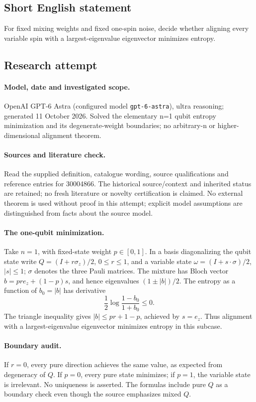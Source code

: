 \documentclass[11pt]{article}
\begin{document}
\subsection{Short English statement}
For fixed mixing weights and fixed one-spin noise, decide whether aligning every variable spin with a largest-eigenvalue eigenvector minimizes entropy.
\subsection{Research attempt}
\paragraph{Model, date and investigated scope.}
OpenAI GPT-6 Astra (configured model \texttt{gpt-6-astra}), ultra reasoning; generated 11 October 2026. Solved the elementary n=1 qubit entropy minimization and its degenerate-weight boundaries; no arbitrary-n or higher-dimensional alignment theorem.

\paragraph{Sources and literature check.}
Read the supplied definition, catalogue wording, source qualifications and reference entries for 30004866. The historical source/context and inherited status are retained; no fresh literature or novelty certification is claimed. No external theorem is used without proof in this attempt; explicit model assumptions are distinguished from facts about the source model.

\paragraph{The one-qubit minimization.} Take \(n=1\), with fixed-state weight \(p\in[0,1]\). In a basis diagonalizing the qubit state write \(Q=(I+r\sigma_z)/2\), \(0\le r\le1\), and a variable state \(\omega=(I+s\cdot\sigma)/2\), \(|s|\le1\); \(\sigma\) denotes the three Pauli matrices. The mixture has Bloch vector \(b=pr e_z+(1-p)s\), and hence eigenvalues \((1\pm|b|)/2\). The entropy as a function of \(b_0=|b|\) has derivative
\[
 \frac12\log\frac{1-b_0}{1+b_0}\le0.
\]
The triangle inequality gives \(|b|\le pr+1-p\), achieved by \(s=e_z\). Thus alignment with a largest-eigenvalue eigenvector minimizes entropy in this subcase.
\paragraph{Boundary audit.} If \(r=0\), every pure direction achieves the same value, as expected from degeneracy of \(Q\). If \(p=0\), every pure state minimizes; if \(p=1\), the variable state is irrelevant. No uniqueness is asserted. The formulas include pure \(Q\) as a boundary check even though the source emphasizes mixed \(Q\).
\end{document}

